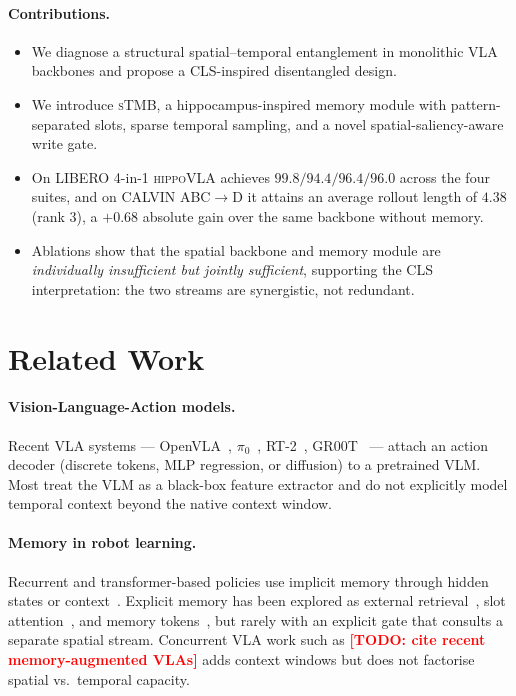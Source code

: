\documentclass[10pt,letterpaper]{article}
\newcommand{\todo}[1]{\textcolor{red}{\textbf{[TODO: #1]}}}
\newcommand{\method}{\textsc{hippoVLA}\xspace}
\newcommand{\sTMB}{\textsc{sTMB}\xspace}
\begin{document}
\paragraph{Contributions.}
\begin{itemize}[leftmargin=*]
    \item We diagnose a structural spatial--temporal entanglement in monolithic VLA backbones and propose a CLS-inspired disentangled design.
    \item We introduce \sTMB, a hippocampus-inspired memory module with pattern-separated slots, sparse temporal sampling, and a novel spatial-saliency-aware write gate.
    \item On LIBERO 4-in-1 \method achieves $99.8/94.4/96.4/96.0$ across the four suites, and on CALVIN ABC$\rightarrow$D it attains an average rollout length of $4.38$ (rank 3), a $+0.68$ absolute gain over the same backbone without memory.
    \item Ablations show that the spatial backbone and memory module are \emph{individually insufficient but jointly sufficient}, supporting the CLS interpretation: the two streams are synergistic, not redundant.
\end{itemize}

\section{Related Work}
\label{sec:related}

\paragraph{Vision-Language-Action models.}
Recent VLA systems --- OpenVLA~\citep{kim2024openvla}, $\pi_0$~\citep{black2024pi0}, RT-2~\citep{brohan2023rt2}, GR00T~\citep{nvidia2025gr00t} --- attach an action decoder (discrete tokens, MLP regression, or diffusion) to a pretrained VLM. Most treat the VLM as a black-box feature extractor and do not explicitly model temporal context beyond the native context window.

\paragraph{Memory in robot learning.}
Recurrent and transformer-based policies use implicit memory through hidden states or context~\citep{brohan2023rt2,reed2022gato}. Explicit memory has been explored as external retrieval~\citep{wu2022memorizing}, slot attention~\citep{locatello2020slot}, and memory tokens~\citep{bulatov2022rmt}, but rarely with an explicit gate that consults a separate spatial stream. Concurrent VLA work such as \todo{cite recent memory-augmented VLAs} adds context windows but does not factorise spatial vs.\ temporal capacity.
\end{document}
